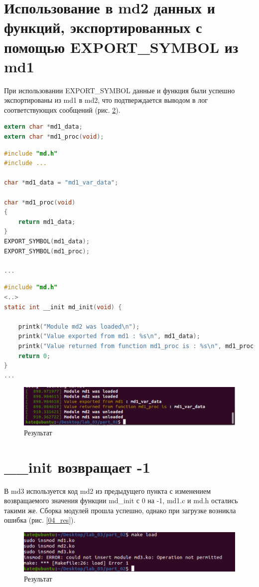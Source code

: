 \documentclass[12pt]{report}
\begin{document}
\section*{Использование в md2 данных и функций, экспортированных с помощью EXPORT\_SYMBOL из md1}
При использовании EXPORT\_SYMBOL данные и функция были успешно экспортированы из md1 в md2, что подтверждается выводом в лог соответствующих сообщений (рис. \ref{01_res}).
\begin{lstlisting}[label=01_mdh,caption=md.h,language=C]
extern char *md1_data;
extern char *md1_proc(void);
\end{lstlisting}
\begin{lstlisting}[label=01_md1,caption=md1.c,language=C]
#include "md.h"
#include ...

char *md1_data = "md1_var_data";

char *md1_proc(void)
{
	return md1_data;
}
EXPORT_SYMBOL(md1_data);
EXPORT_SYMBOL(md1_proc);

...
\end{lstlisting}
\begin{lstlisting}[label=01_md2,caption=md2.c,language=C]
#include "md.h"
<..>
static int __init md_init(void) {
    
    printk("Module md2 was loaded\n");
    printk("Value exported from md1 : %s\n", md1_data);
    printk("Value returned from function md1_proc is : %s\n", md1_proc());
    return 0;
}
...
\end{lstlisting}

\begin{figure}[H]
	\centering
	\includegraphics[scale = 0.6]{exp_symb.png}
	\caption{Результат}
	\label{01_res}
\end{figure}
\newpage
\section*{\_\_init возвращает -1}
В md3 используется код md2 из предыдущего пункта с изменением возвращаемого значения функции md\_init с 0 на -1, md1.c и md.h остались такими же. Сборка модулей прошла успешно, однако при загрузке возникла ошибка (рис. \ref{04_res}).

\begin{figure}[H]
	\centering
	\includegraphics[scale = 0.6]{init_err.png}
	\caption{Результат}
	\label{01_res}
\end{figure}
\end{document}
